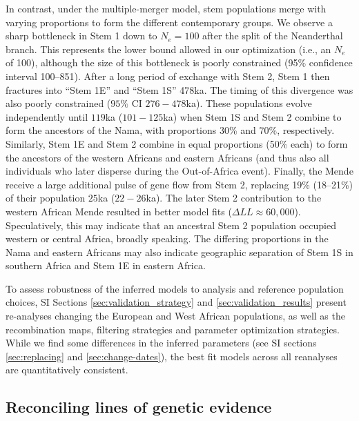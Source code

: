 \documentclass[]{article}
\begin{document}
In contrast, under the multiple-merger model, stem populations merge with
varying proportions to form the different contemporary groups.  We observe a
sharp bottleneck in Stem 1 down to $N_e=100$ after the split of the Neanderthal
branch. This represents the lower bound allowed in our optimization (i.e., an
$N_e$ of 100), although the size of this bottleneck is poorly constrained (95\%
confidence interval 100--851). After a long period of exchange with Stem 2,
Stem 1 then fractures into ``Stem 1E'' and ``Stem 1S'' 478ka. The timing of
this divergence was also poorly constrained ($95\%$ CI $276-478$ka).  These
populations evolve independently until $119$ka ($101-125$ka) when Stem 1S and Stem
2 combine to form the ancestors of the Nama, with proportions 30\% and 70\%,
respectively. Similarly, Stem 1E and Stem 2 combine in equal proportions (50\%
each) to form the ancestors of the western Africans and eastern Africans (and
thus also all individuals who later disperse during the Out-of-Africa event).
Finally, the Mende receive a large additional pulse of gene flow from Stem 2,
replacing 19\% (18--21\%) of their population $25$ka ($22-26$ka). The later Stem 2
contribution to the western African Mende resulted in better model fits
($\Delta LL \approx 60,000$). Speculatively, this may indicate that an
ancestral Stem 2 population occupied western or central Africa, broadly
speaking. The differing proportions in the Nama and eastern Africans may also
indicate geographic separation of Stem 1S in southern Africa and Stem 1E in
eastern Africa. 

To assess robustness of the inferred models to analysis and reference
population choices, SI Sections \ref{sec:validation_strategy}
and \ref{sec:validation_results} present re-analyses changing the European and
West African populations, as well as the recombination maps, filtering
strategies and parameter optimization strategies. While we find some
differences in the inferred parameters (see SI sections
\ref{sec:replacing} and \ref{sec:change-dates}), the best fit models across all
reanalyses are quantitatively consistent. 

\subsection*{Reconciling lines of genetic evidence}
\end{document}
